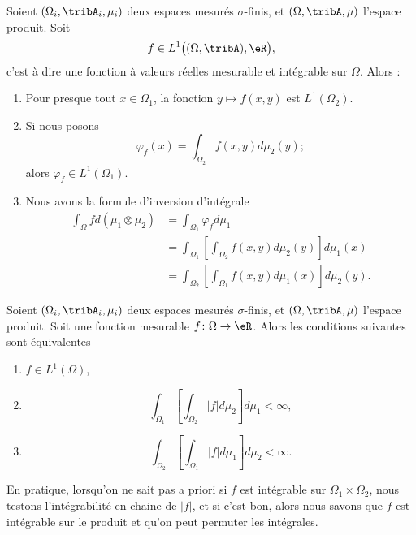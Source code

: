 \begin{theorem}\label{ThoFubinioYLtPI}
    Soient \( (\Omega_i,\tribA_i,\mu_i)\) deux espaces mesurés \( \sigma\)-finis, et \( (\Omega,\tribA,\mu)\) l'espace produit. Soit 
    \begin{equation}
        f\in L^1\big( (\Omega,\tribA),\eR \big),
    \end{equation}
    c'est à dire une fonction à valeurs réelles mesurable et intégrable sur \( \Omega\). Alors :
    \begin{enumerate}
        \item
            Pour presque tout \( x\in \Omega_1\), la fonction \( y\mapsto f(x,y)\) est \( L^1(\Omega_2)\).
        \item
            Si nous posons
            \begin{equation}
                \varphi_f(x)=\int_{\Omega_2}f(x,y)d\mu_2(y);
            \end{equation}
            alors \( \varphi_f\in L^1(\Omega_1)\).
        \item
            Nous avons la formule d'inversion d'intégrale
            \begin{subequations}
                \begin{align}
                \int_{\Omega}fd(\mu_1\otimes \mu_2)&=\int_{\Omega_1}\varphi_fd\mu_1\\
                &=\int_{\Omega_1}\left[ \int_{\Omega_2}f(x,y)d\mu_2(y) \right]d\mu_1(x)\\
                &=\int_{\Omega_2}\left[ \int_{\Omega_1}f(x,y)d\mu_1(x) \right]d\mu_2(y).
                \end{align}
            \end{subequations}
    \end{enumerate}
\end{theorem}

\begin{corollary}\label{CorTKZKwP}
    Soient \( (\Omega_i,\tribA_i,\mu_i)\) deux espaces mesurés \( \sigma\)-finis, et \( (\Omega,\tribA,\mu)\) l'espace produit. Soit une fonction mesurable \( f\colon \Omega\to \eR\). Alors les conditions suivantes sont équivalentes
    \begin{enumerate}
        \item
            \( f\in L^1(\Omega)\),
        \item
            \begin{equation}
                \int_{\Omega_1}\left[ \int_{\Omega_2}| f |d\mu_2 \right]d\mu_1 <\infty,
            \end{equation}
        \item
            \begin{equation}
                \int_{\Omega_2}\left[ \int_{\Omega_1}| f |d\mu_1 \right]d\mu_2 <\infty.
            \end{equation}
    \end{enumerate}
\end{corollary}
En pratique, lorsqu'on ne sait pas a priori si \( f\) est intégrable sur \( \Omega_1\times \Omega_2\), nous testons l'intégrabilité en chaine de \( | f |\), et si c'est bon, alors nous savons que \( f\) est intégrable sur le produit et qu'on peut permuter les intégrales.

